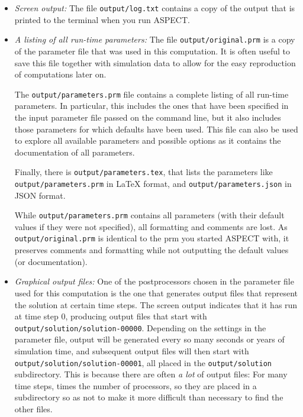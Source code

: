 \documentclass{article}
\newcommand{\aspect}{\textsc{ASPECT}}
\begin{document}
\begin{itemize}

\item \textit{Screen output:} The file \texttt{output/log.txt} contains a copy
  of the output that is printed to the terminal when you run \aspect{}.

\item \textit{A listing of all run-time parameters:} The file
  \texttt{output/original.prm} is a copy of the parameter file that was used
  in this computation. It is often useful to save this file together with
  simulation data to allow for the easy reproduction of computations later on.

  The \texttt{output/parameters.prm} file contains a complete listing of all
  run-time parameters. In particular, this includes the ones that have been
  specified in the input parameter file passed on the command line, but it
  also includes those parameters for which defaults have been used. This file
  can also be used to explore all available parameters and possible options as
  it contains the documentation of all parameters.

  Finally, there is \texttt{output/parameters.tex}, that lists the parameters
  like \texttt{output/parameters.prm} in \LaTeX{} format, and
  \texttt{output/parameters.json} in JSON format.

  While \texttt{output/parameters.prm} contains all parameters (with their
  default values if they were not specified), all formatting and comments are
  lost. As \texttt{output/original.prm} is identical to the prm you started
  \aspect{} with, it preserves comments and formatting while not outputting
  the default values (or documentation).

\item \textit{Graphical output files:} One of the postprocessors chosen
  in the parameter file used for this computation is the one that generates
  output files that represent the solution at certain time steps. The screen output
  indicates that it has run at time step 0, producing output files that start
  with \texttt{output/solution/solution-00000}. Depending on the settings in the
  parameter file, output will be generated every so many seconds or years of
  simulation time, and subsequent output files will then start with
  \texttt{output/solution/solution-00001}, all placed in the
  \texttt{output/solution} subdirectory. This is because there are often
  \textit{a lot} of output files: For many time steps, times the number of
  processors, so they are placed in a subdirectory so as not to make it more
  difficult than necessary to find the other files.


\end{itemize}
\end{document}
